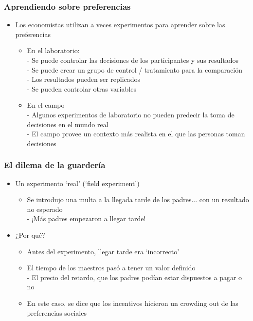 \documentclass{beamer}
\begin{document}
\begin{frame}
\frametitle{ Aprendiendo sobre preferencias}
\begin{itemize}
    \item Los economistas utilizan a veces experimentos para aprender sobre las preferencias
    \begin{itemize}
        \item En el laboratorio: \\
        - Se puede controlar las decisiones de los participantes y sus resultados \\
        - Se puede crear un grupo de control / tratamiento para la comparación \\
        - Los resultados pueden ser replicados \\
        - Se pueden controlar otras variables
        \item En el campo \\
        - Algunos experimentos de laboratorio no pueden predecir la toma de decisiones en el mundo real \\
        - El campo provee un contexto más realista en el que las personas toman decisiones
    \end{itemize}
\end{itemize}
\end{frame}

\begin{frame}
\frametitle{ El dilema de la guardería}
\begin{itemize}
    \item Un experimento `real' (`field experiment')
       \begin{itemize}
       \item Se introdujo una multa a la llegada tarde de los padres... con un resultado no esperado \\
        - ¡Más padres empezaron a llegar tarde!
        \end{itemize}
    \item ¿Por qué?
        \begin{itemize}
        \item Antes del experimento, llegar tarde era `incorrecto' 
        \item El tiempo de los maestros pasó a tener un valor definido \\
        - El precio del retardo, que los padres podían estar dispuestos a pagar o no \\ 
        \item En este caso, se dice que los incentivos hicieron un crowding out de las preferencias sociales
    \end{itemize}
\end{itemize}
\end{frame}
\end{document}
